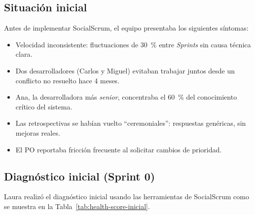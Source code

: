 \subsection{Situación inicial}

Antes de implementar SocialScrum, el equipo presentaba los siguientes síntomas:

\begin{itemize}
    \item Velocidad inconsistente: fluctuaciones de 30~\% entre \textit{Sprints} sin causa técnica clara.
    \item Dos desarrolladores (Carlos y Miguel) evitaban trabajar juntos desde un conflicto no resuelto hace 4 meses.
    \item Ana, la desarrolladora más \textit{senior}, concentraba el 60~\% del conocimiento crítico del sistema.
    \item Las retrospectivas se habían vuelto ``ceremoniales'': respuestas genéricas, sin mejoras reales.
    \item El PO reportaba fricción frecuente al solicitar cambios de prioridad.
\end{itemize}

\subsection{Diagnóstico inicial (Sprint 0)}

Laura realizó el diagnóstico inicial usando las herramientas de SocialScrum como se muestra en la Tabla~\ref{tab:health-score-inicial}.

\begingroup
\scriptsize
\renewcommand{\arraystretch}{1.4}
\setlength{\tabcolsep}{4pt}
\setlength{\LTleft}{0pt}
\setlength{\LTright}{0pt}

